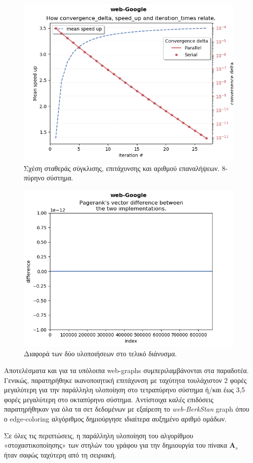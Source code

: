\begin{center}
\begin{figure}
\includegraphics[width=\linewidth]{plots/speed_up_diades.png}
\caption{Σχέση σταθεράς σύγκλισης, επιτάχυνσης και αριθμού επαναλήψεων. 8-πύρηνο σύστημα.}
\label{fig:relatd}
\end{figure}

\begin{figure}
\includegraphics[width=\linewidth]{plots/diff.png}
\caption{Διαφορά των δύο υλοποιήσεων στο τελικό διάνυσμα.}
\label{fig:dif}
\end{figure}

\end{center}


Αποτελέσματα και για τα υπόλοιπα web-graphs συμπεριλαμβάνονται στα παραδοτέα. Γενικώς, παρατηρήθηκε ικανοποιητική επιτάχυνση με ταχύτητα τουλάχιστον 2 φορές μεγαλύτερη για την παράλληλη υλοποίηση στο τετραπύρηνο σύστημα ή/και έως 3,5 φορές μεγαλύτερη στο οκταπύρηνο σύστημα. Αντίστοιχα καλές επιδόσεις παρατηρήθηκαν για όλα τα σετ δεδομένων με εξαίρεση το \textit{web-BerkStan} graph όπου ο edge-coloring αλγόριθμος δημιούργησε ιδιαίτερα αυξημένο αριθμό ομάδων.

Σε όλες τις περιπτώσεις, η παράλληλη υλοποίηση του αλγορίθμου «στοχαστικοποίησης» των στηλών του γράφου για την δημιουργία του πίνακα $\bm{A}_s$ ήταν σαφώς ταχύτερη από τη σειριακή.
